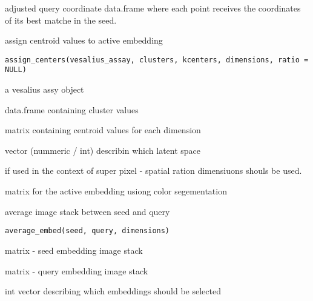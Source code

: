 \documentclass[a4paper]{book}
\begin{document}
%
\begin{Value}
adjusted query coordinate data.frame where each point
receives the coordinates of its best matche in the seed.
\end{Value}
%
\begin{Description}
assign centroid values to active embedding
\end{Description}
%
\begin{Usage}
\begin{verbatim}
assign_centers(vesalius_assay, clusters, kcenters, dimensions, ratio = NULL)
\end{verbatim}
\end{Usage}
%
\begin{Arguments}
\begin{ldescription}
\item[\code{vesalius\_assay}] a vesalius assy object

\item[\code{clusters}] data.frame containing cluster values

\item[\code{kcenters}] matrix containing centroid values for each dimension

\item[\code{dimensions}] vector (nummeric / int) describin which latent space

\item[\code{ratio}] if used in the context of super pixel - spatial ration
dimensiuons shouls be used.
\end{ldescription}
\end{Arguments}
%
\begin{Value}
matrix for the active embedding usiong color segementation
\end{Value}
%
\begin{Description}
average image stack between seed and query
\end{Description}
%
\begin{Usage}
\begin{verbatim}
average_embed(seed, query, dimensions)
\end{verbatim}
\end{Usage}
%
\begin{Arguments}
\begin{ldescription}
\item[\code{seed}] matrix - seed embedding image stack

\item[\code{query}] matrix - query embedding image stack

\item[\code{dimensions}] int vector describing which embeddings
should be selected
\end{ldescription}
\end{Arguments}
\end{document}

